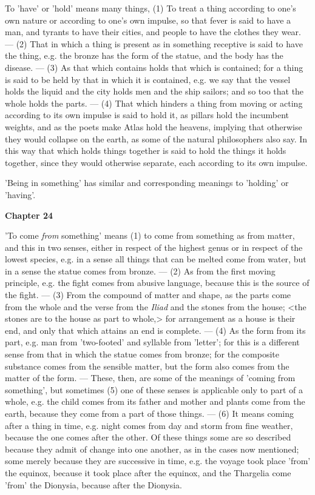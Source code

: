 To 'have' or 'hold' means many things, (1) To treat a thing according to one's own nature or according to one's own impulse, so that fever is said to have a man, and tyrants to have their cities, and people to have the clothes they wear. — (2) That in which a thing is present as in something receptive is said to have the thing, e.g. the bronze has the form of the statue, and the body has the disease. — (3) As that which contains holds that which is contained; for a thing is said to be held by that in which it is contained, e.g. we say that the vessel holds the liquid and the city holds men and the ship sailors; and so too that the whole holds the parts. — (4) That which hinders a thing from moving or acting according to its own impulse is said to hold it, as pillars hold the incumbent weights, and as the poets make Atlas hold the heavens, implying that otherwise they would collapse on the earth, as some of the natural philosophers also say. In this way that which holds things together is said to hold the things it holds together, since they would otherwise separate, each according to its own impulse.

'Being in something' has similar and corresponding meanings to 'holding' or 'having'.

\textbf{Chapter 24}

'To come \emph{from} something' means (1) to come from something as from matter, and this in two senses, either in respect of the highest genus or in respect of the lowest species, e.g. in a sense all things that can be melted come from water, but in a sense the statue comes from bronze. — (2) As from the first moving principle, e.g. the fight comes from abusive language, because this is the source of the fight. — (3) From the compound of matter and shape, as the parts come from the whole and the verse from the \emph{Iliad} and the stones from the house; <the stones are to the house as part to whole,> for arrangement as a house is their end, and only that which attains an end is complete. — (4) As the form from its part, e.g. man from 'two-footed' and syllable from 'letter'; for this is a different sense from that in which the statue comes from bronze; for the composite substance comes from the sensible matter, but the form also comes from the matter of the form. — These, then, are some of the meanings of 'coming from something', but sometimes (5) one of these senses is applicable only to part of a whole, e.g. the child comes from its father and mother and plants come from the earth, because they come from a part of those things. — (6) It means coming after a thing in time, e.g. night comes from day and storm from fine weather, because the one comes after the other. Of these things some are so described because they admit of change into one another, as in the cases now mentioned; some merely because they are successive in time, e.g. the voyage took place 'from' the equinox, because it took place after the equinox, and the Thargelia come 'from' the Dionysia, because after the Dionysia.

